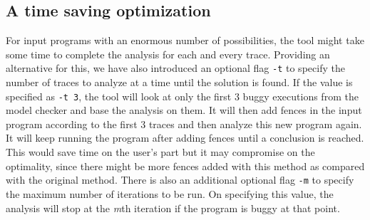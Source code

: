\subsection{A time saving optimization} \label{sec:opti}
For input programs with an enormous number of possibilities, the 
tool might take some time to complete the analysis for each and 
every trace. Providing an alternative for this, we have also 
introduced an optional flag \texttt{-t} to specify the number 
of traces to analyze at a time until the solution is found. 
If the value is specified as \texttt{-t 3}, the tool will look 
at only the first 3 buggy executions from the model checker and 
base the analysis on them. It will then add fences in the input 
program according to the first 3 traces and then analyze this 
new program again. It will keep running the program after 
adding fences until a conclusion is reached. This would save 
time on the user's part but it may compromise on the optimality, 
since there might be more fences added with this method as compared 
with the original method. There is also an additional optional 
flag \texttt{-m} to specify the maximum number of iterations to 
be run. On specifying this value, the analysis will stop at the 
\textit{m}th iteration if the program is buggy at that point.

